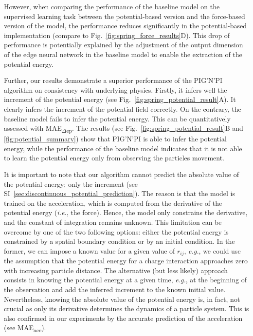 \documentclass{article}
\newcommand{\pignpi}{PIG'N'PI\xspace}
\newcommand{\APPENDIX}{SI} %
\begin{document}
However, when comparing the performance of the baseline model on the supervised learning task  between the potential-based version and the force-based version of the model, the performance reduces significantly in the potential-based implementation (compare to Fig.~\ref{fig:spring_force_results}D). 
This drop of performance is potentially explained by the adjustment of the output dimension of the edge neural network in the baseline model to enable the extraction of the potential energy.  

Further, our results demonstrate a superior performance of the \pignpi algorithm on consistency with underlying physics. Firstly, it infers well the increment of the potential energy (see Fig.~\ref{fig:spring_potential_result}A). It clearly infers the increment of the potential field correctly. On the contrary, the baseline model fails to infer the potential energy. This can be quantitatively assessed with \textsf{MAE\textsubscript{$\Delta$ep}}. The results (see Fig.~\ref{fig:spring_potential_result}B and \ref{fig:potential_summary}) show that \pignpi is able to infer the potential energy, while the performance of the baseline model indicates that it is not able to learn the potential energy only from observing the particles movement. 

It is important to note that our algorithm cannot predict the absolute value of the potential energy; only the increment (see \APPENDIX~\ref{sec:discontinuous_potential_prediction}). The reason is that the model is trained on the acceleration, which is computed from the derivative of the potential energy (\textit{i.e.}, the force). Hence, the model only constrains the derivative, and the constant of integration remains unknown. This limitation can be overcome by one of the two following options:  either the potential energy is constrained by a spatial boundary condition or by an initial condition. In the former, we can impose a known value for a given value of $r_{ij}$, \textit{e.g.}, we could use the assumption that the potential energy for a charge interaction approaches zero with increasing particle distance. The alternative (but less likely) approach consists in knowing the potential energy at a given time, \textit{e.g.}, at the beginning of the observation and add the inferred increment to the known initial value. Nevertheless, knowing the absolute value of the potential energy is, in fact, not crucial as only its derivative determines the dynamics of a particle system. This is also confirmed in our experiments by the accurate prediction of the acceleration (see \textsf{MAE\textsubscript{acc}}).
\end{document}
